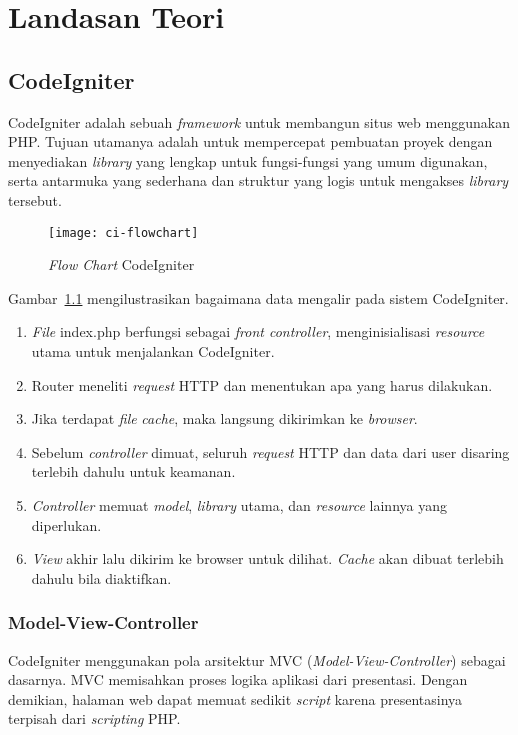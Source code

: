 \chapter{Landasan Teori}
\label{chap:teori}

\section{CodeIgniter}
\label{sec:codeigniter} 

CodeIgniter adalah sebuah \textit{framework} untuk membangun situs web menggunakan PHP. Tujuan utamanya adalah untuk mempercepat pembuatan proyek dengan menyediakan \textit{library} yang lengkap untuk fungsi-fungsi yang umum digunakan, serta antarmuka yang sederhana dan struktur yang logis untuk mengakses \textit{library} tersebut.


\begin{figure}[H]
	\centering  
	\texttt{[image: ci-flowchart]}  
	\caption[\textit{Flow Chart} CodeIgniter]{\textit{Flow Chart} CodeIgniter} 
	\label{fig:ciflowchart} 
\end{figure} 

Gambar~\ref{fig:ciflowchart} mengilustrasikan bagaimana data mengalir pada sistem CodeIgniter.

\begin{enumerate}
	\item \textit{File} index.php berfungsi sebagai \textit{front controller}, menginisialisasi \textit{resource} utama untuk menjalankan CodeIgniter.
	\item Router meneliti \textit{request} HTTP dan menentukan apa yang harus dilakukan.
	\item Jika terdapat \textit{file} \textit{cache}, maka langsung dikirimkan ke \textit{browser}.
	\item Sebelum \textit{controller} dimuat, seluruh \textit{request} HTTP dan data dari user disaring terlebih dahulu untuk keamanan.
	\item \textit{Controller} memuat \textit{model}, \textit{library} utama, dan  \textit{resource} lainnya yang diperlukan.
	\item \textit{View} akhir lalu dikirim ke browser untuk dilihat. \textit{Cache} akan dibuat terlebih dahulu bila diaktifkan. 
\end{enumerate}

\subsection{Model-View-Controller}
\label{subs:cimvc} 
CodeIgniter menggunakan pola arsitektur MVC (\textit{Model-View-Controller}) sebagai dasarnya. MVC memisahkan proses logika aplikasi dari presentasi. Dengan demikian, halaman web dapat memuat sedikit \textit{script} karena presentasinya terpisah dari \textit{scripting} PHP.

